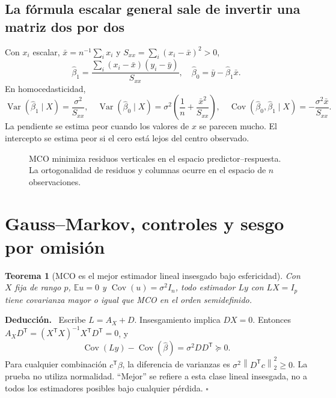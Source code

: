 \documentclass[11pt,a4paper]{article}
\newcommand{\E}{\mathbb E}
\newcommand{\T}{^{\mathsf T}}
\newcommand{\norm}[1]{\left\lVert #1\right\rVert}
\DeclareMathOperator{\Var}{Var}
\DeclareMathOperator{\Cov}{Cov}
\newenvironment{deduccion}{\par\textbf{Deducción.}\ }{\hfill$\square$\par}
\newtheorem{teorema}{Teorema}[section]
\theoremstyle{definition}
\begin{document}
\subsection{La fórmula escalar general sale de invertir una matriz dos por dos}
Con $x_i$ escalar, $\bar x=n^{-1}\sum_i x_i$ y $S_{xx}=\sum_i(x_i-\bar x)^2>0$,
\[
\widehat\beta_1=\frac{\sum_i(x_i-\bar x)(y_i-\bar y)}{S_{xx}},\quad
\widehat\beta_0=\bar y-\widehat\beta_1\bar x.
\]
En homocedasticidad,
\[
\Var(\widehat\beta_1\mid X)=\frac{\sigma^2}{S_{xx}},\quad
\Var(\widehat\beta_0\mid X)=\sigma^2\left(\frac1n+\frac{\bar x^2}{S_{xx}}\right),\quad
\Cov(\widehat\beta_0,\widehat\beta_1\mid X)=-\frac{\sigma^2\bar x}{S_{xx}}.
\]
La pendiente se estima peor cuando los valores de $x$ se parecen mucho. El intercepto se estima peor si el cero está lejos del centro observado.
\begin{figure}[H]\centering
{}
\caption{MCO minimiza residuos verticales en el espacio predictor--respuesta. La ortogonalidad de residuos y columnas ocurre en el espacio de $n$ observaciones.}
\end{figure}

\section{Gauss--Markov, controles y sesgo por omisión}
\begin{teorema}[MCO es el mejor estimador lineal insesgado bajo esfericidad]
Con $X$ fija de rango $p$, $\E u=0$ y $\Cov(u)=\sigma^2I_n$, todo estimador $Ly$ con $LX=I_p$ tiene covarianza mayor o igual que MCO en el orden semidefinido.
\end{teorema}
\begin{deduccion}
Escribe $L=A_X+D$. Insesgamiento implica $DX=0$. Entonces $A_XD\T=(X\T X)^{-1}X\T D\T=0$, y
\[
\Cov(Ly)-\Cov(\widehat\beta)=\sigma^2DD\T\succeq0.
\]
Para cualquier combinación $c\T\beta$, la diferencia de varianzas es $\sigma^2\norm{D\T c}_2^2\ge0$. La prueba no utiliza normalidad. ``Mejor'' se refiere a esta clase lineal insesgada, no a todos los estimadores posibles bajo cualquier pérdida.
\end{deduccion}
\end{document}
